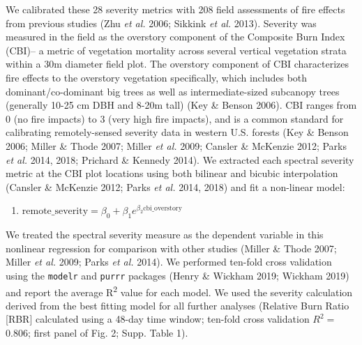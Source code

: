 \documentclass[]{article}
\providecommand{\tightlist}{%
  \setlength{\itemsep}{0pt}\setlength{\parskip}{0pt}}
\begin{document}
We calibrated these 28 severity metrics with 208 field assessments of
fire effects from previous studies (Zhu \emph{et al.} 2006; Sikkink
\emph{et al.} 2013). Severity was measured in the field as the overstory
component of the Composite Burn Index (CBI)-- a metric of vegetation
mortality across several vertical vegetation strata within a 30m
diameter field plot. The overstory component of CBI characterizes fire
effects to the overstory vegetation specifically, which includes both
dominant/co-dominant big trees as well as intermediate-sized subcanopy
trees (generally 10-25 cm DBH and 8-20m tall) (Key \& Benson 2006). CBI
ranges from 0 (no fire impacts) to 3 (very high fire impacts), and is a
common standard for calibrating remotely-sensed severity data in western
U.S. forests (Key \& Benson 2006; Miller \& Thode 2007; Miller \emph{et
al.} 2009; Cansler \& McKenzie 2012; Parks \emph{et al.} 2014, 2018;
Prichard \& Kennedy 2014). We extracted each spectral severity metric at
the CBI plot locations using both bilinear and bicubic interpolation
(Cansler \& McKenzie 2012; Parks \emph{et al.} 2014, 2018) and fit a
non-linear model:

\begin{enumerate}
\def\labelenumi{(\arabic{enumi})}
\tightlist
\item
  \(\label{eq-cbi-calibration} \text{remote\_severity} = \beta_0 + \beta_1 e^{\beta_2 \text{cbi\_overstory}}\)
\end{enumerate}

We treated the spectral severity measure as the dependent variable in
this nonlinear regression for comparison with other studies (Miller \&
Thode 2007; Miller \emph{et al.} 2009; Parks \emph{et al.} 2014). We
performed ten-fold cross validation using the \texttt{modelr} and
\texttt{purrr} packages (Henry \& Wickham 2019; Wickham 2019) and report
the average R\textsuperscript{2} value for each model. We used the
severity calculation derived from the best fitting model for all further
analyses (Relative Burn Ratio {[}RBR{]} calculated using a 48-day time
window; ten-fold cross validation \(R^2 =\) 0.806; first panel of Fig.
2; Supp. Table 1).
\end{document}
